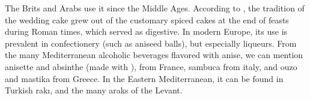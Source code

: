 The Brits and Arabs use it since the Middle Ages. According to \textcite{wilson_wedding_2005}, 
the tradition of the wedding cake grew out of the customary spiced cakes at the end of feasts during Roman times, which served as digestive. In modern Europe, its use is prevalent in confectionery (such as aniseed balls), but especially liqueurs. From the many Mediterranean alcoholic beverages flavored with anise, we can mention anisette and absinthe (made with ), from France, sambuca from italy, and ouzo and mastika from Greece. 
In the Eastern Mediterranean, it can be found in Turkish rakı, and the many araks of the Levant.




